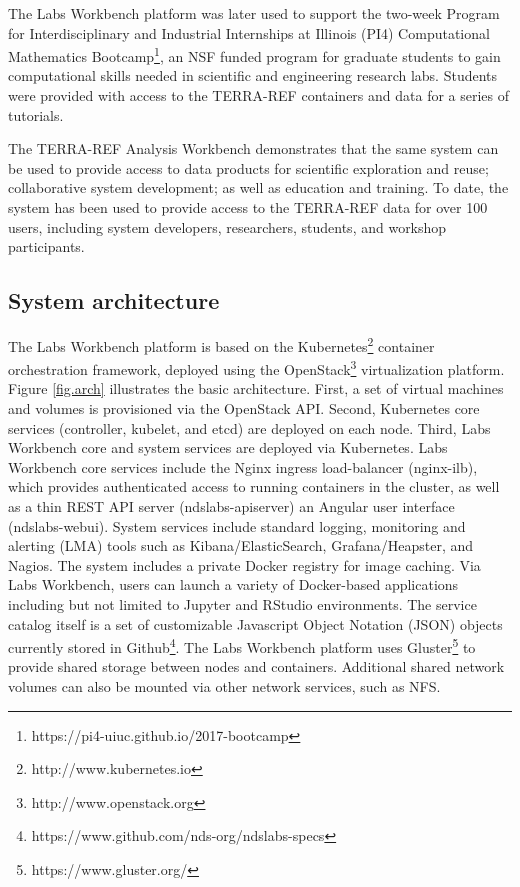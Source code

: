 \documentclass{sig-alternate}
\begin{document}
The Labs Workbench platform was later used to support the two-week Program for Interdisciplinary and Industrial Internships at Illinois (PI4) Computational Mathematics Bootcamp\footnote{https://pi4-uiuc.github.io/2017-bootcamp}, an NSF funded program for graduate students to gain computational skills needed in scientific and engineering research labs. Students were provided with access to the TERRA-REF containers and data for a series of tutorials.

The TERRA-REF Analysis Workbench demonstrates that the same system can be used to provide access to data products for scientific exploration and reuse; collaborative system development; as well as education and training. To date, the system has been used to provide access to the TERRA-REF data for over 100 users, including system developers, researchers, students, and workshop participants.


\subsection{System architecture}

The Labs Workbench platform is based on the Kubernetes\footnote{http://www.kubernetes.io} container orchestration framework, deployed using the OpenStack\footnote{http://www.openstack.org} virtualization platform. Figure \ref{fig.arch} illustrates the basic architecture. First, a set of virtual machines and volumes is provisioned via the OpenStack API. Second, Kubernetes core services (controller, kubelet, and etcd) are deployed on each node. Third, Labs Workbench core and system services are deployed via Kubernetes. Labs Workbench core services include the Nginx ingress load-balancer (nginx-ilb), which provides authenticated access to running containers in the cluster, as well as a thin REST API server (ndslabs-apiserver) an Angular user interface (ndslabs-webui). System services include standard logging, monitoring and alerting (LMA) tools such as Kibana/ElasticSearch, Grafana/Heapster, and Nagios.  The system includes a private Docker registry for image caching.  Via Labs Workbench, users can launch a variety of Docker-based applications including but not limited to Jupyter and RStudio environments. The service catalog itself is a set of customizable Javascript Object Notation (JSON) objects currently stored in Github\footnote{https://www.github.com/nds-org/ndslabs-specs}. The Labs Workbench platform uses Gluster\footnote{https://www.gluster.org/} to provide shared storage between nodes and containers. Additional shared network volumes can also be mounted via other network services, such as NFS.
\end{document}
